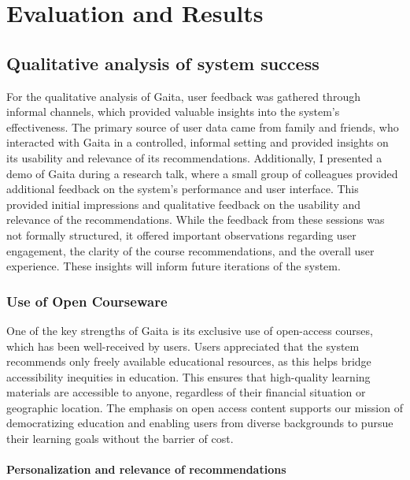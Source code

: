 \chapter{Evaluation and Results} \label{chap:chap-5}



\section{Qualitative analysis of system success}

For the qualitative analysis of Gaita, user feedback was gathered through informal channels, which provided valuable insights into the system’s effectiveness. The primary source of user data came from family and friends, who interacted with Gaita in a controlled, informal setting and provided insights on its usability and relevance of its recommendations. Additionally, I presented a demo of Gaita during a research talk, where a small group of colleagues provided additional feedback on the system’s performance and user interface. This provided initial impressions and qualitative feedback on the usability and relevance of the recommendations. While the feedback from these sessions was not formally structured, it offered important observations regarding user engagement, the clarity of the course recommendations, and the overall user experience. These insights will inform future iterations of the system.


\subsection{Use of Open Courseware}

One of the key strengths of Gaita is its exclusive use of open-access courses, which has been well-received by users. Users appreciated that the system recommends only freely available educational resources, as this helps bridge accessibility inequities in education. This ensures that high-quality learning materials are accessible to anyone, regardless of their financial situation or geographic location. The emphasis on open access content supports our mission of democratizing education and enabling users from diverse backgrounds to pursue their learning goals without the barrier of cost. 

\subsubsection{Personalization and relevance of recommendations} 

